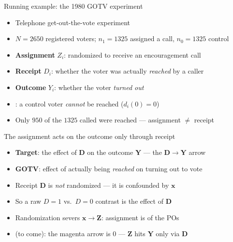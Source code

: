 \documentclass[table, xcolor = {dvipsnames}, 9pt]{beamer}
\theoremstyle{plain}
\newcommand{\mh}[1]{{\color{magenta}{#1}}}
\begin{document}
\begin{frame}[t]{Running example: the 1980 GOTV experiment}
\vfill
\begin{itemize} \vfill
\item Telephone get-out-the-vote experiment \citep{adamssmith1980} \vfill
\item $N = 2650$ registered voters; $n_1 = 1325$ assigned a call, $n_0 = 1325$ control \vfill
\item \textbf{Assignment} $Z_i$: randomized to receive an encouragement call \vfill
\item \textbf{Receipt} $D_i$: whether the voter was actually \emph{reached} by a caller \vfill
\item \textbf{Outcome} $Y_i$: whether the voter \emph{turned out} \vfill
\item \mh{One-sided noncompliance}: a control voter \emph{cannot} be reached ($d_i(0) = 0$) \vfill
\item Only $950$ of the $1325$ called were reached --- assignment $\neq$ receipt \vfill
\end{itemize} \vfill
\end{frame}
\begin{frame}[t]{The assignment acts on the outcome only through receipt}
\vfill
\begin{center}
\end{center}
\vfill
\begin{itemize} \vfill
\item \textbf{Target}: the effect of \mh{receipt} $\bm{D}$ on the outcome $\bm{Y}$ --- the $\bm{D} \to \bm{Y}$ arrow \vfill
\item[] \textbf{GOTV}: effect of actually being \emph{reached} on turning out to vote \vfill
\item Receipt $\bm{D}$ is \emph{not} randomized --- it is confounded by $\bm{x}$ \vfill
\item[] So a raw $D = 1$ vs.\ $D = 0$ contrast is \mh{not} the effect of $\bm{D}$ \vfill
\item Randomization severs $\bm{x} \to \bm{Z}$: assignment is \mh{independent} of the POs \vfill
\item \mh{Exclusion} (to come): the magenta arrow is $0$ --- $\bm{Z}$ hits $\bm{Y}$ only via $\bm{D}$ \vfill
\end{itemize} \vfill
\end{frame}
\end{document}
